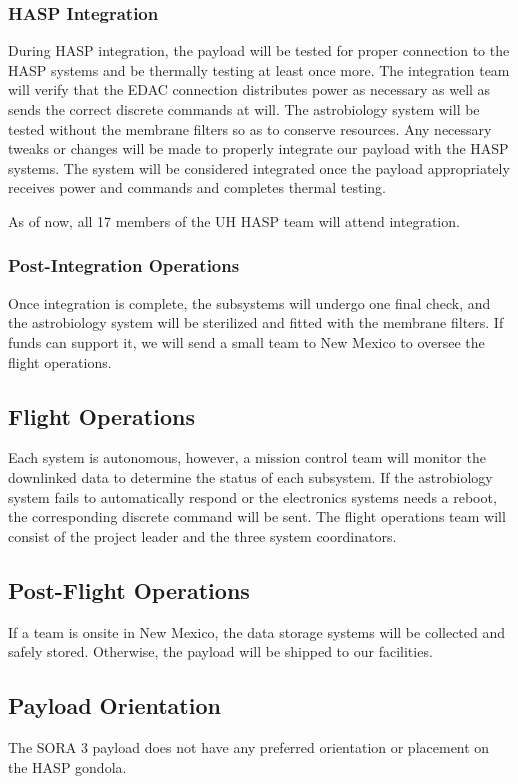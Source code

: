 \subsubsection{HASP Integration}
During HASP integration, the payload will be tested for proper connection to the HASP systems and be thermally testing at least once more.
The integration team will verify that the EDAC connection distributes power as necessary as well as sends the correct discrete commands at will.
The astrobiology system will be tested without the membrane filters so as to conserve resources.
Any necessary tweaks or changes will be made to properly integrate our payload with the HASP systems.
The system will be considered integrated once the payload appropriately receives power and commands and completes thermal testing.

As of now, all \num{17} members of the UH HASP team will attend integration. 

\subsubsection{Post-Integration Operations}
Once integration is complete, the subsystems will undergo one final check, and the astrobiology system will be sterilized and fitted with the membrane filters. If funds can support it, we will send a small team to New Mexico to oversee the flight operations.

\subsection{Flight Operations}
Each system is autonomous, however, a mission control team will monitor the downlinked data to determine the status of each subsystem. If the astrobiology system fails to automatically respond or the electronics systems needs a reboot, the corresponding discrete command will be sent.
The flight operations team will consist of the project leader and the three system coordinators.

\subsection{Post-Flight Operations}
If a team is onsite in New Mexico, the data storage systems will be collected and safely stored. Otherwise, the payload will be shipped to our facilities.

\subsection{Payload Orientation}
The SORA 3 payload does not have any preferred orientation or placement on the HASP gondola.